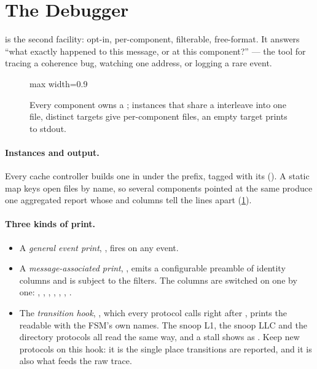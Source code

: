 \section{The Debugger}

 is the second facility: opt-in, per-component, filterable, free-format. It
answers ``what exactly happened to this message, or at this component?'' --- the tool for
tracing a coherence bug, watching one address, or logging a rare event.

\begin{figure}[htbp]\centering
\begin{adjustbox}{max width=0.9\textwidth}\end{adjustbox}
\caption{Every component owns a ; instances that share a  interleave
into one file, distinct targets give per-component files, an empty target prints to stdout.}
\label{fig:debugger-aggregation}
\end{figure}

\paragraph{Instances and output.} Every cache controller builds one in 
under the  prefix, tagged with its  ().
A static map keys open files by name, so several components pointed at the same 
produce one aggregated report whose  and  columns tell the lines apart
(\cref{fig:debugger-aggregation}).

\paragraph{Three kinds of print.}
\begin{itemize}
\item A \emph{general event print}, , fires on any event.
\item A \emph{message-associated print}, , emits a configurable
  preamble of identity columns and is subject to the filters. The columns are switched on one by
  one: , , , ,
  , , .
\item The \emph{transition hook}, ,
  which every protocol calls right after , prints the readable
   with the FSM's own names. The snoop L1, the snoop
  LLC and the directory protocols all read the same way, and a stall shows as
  . Keep new protocols on this hook: it is the single place
  transitions are reported, and it is also what feeds the raw trace.
\end{itemize}

